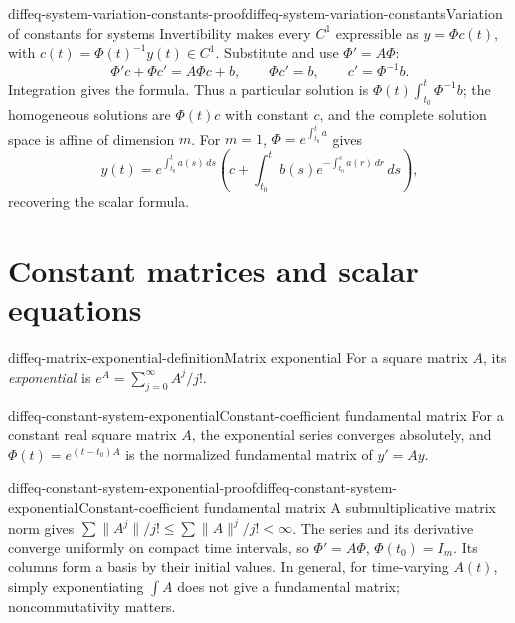 \documentclass[preview]{standalone}
\begin{document}
\begin{snippetproof}{diffeq-system-variation-constants-proof}{diffeq-system-variation-constants}{Variation of constants for systems}
    Invertibility makes every \(C^1\) \function expressible as
    \(y=\Phi c(t)\), with \(c(t)=\Phi(t)^{-1}y(t)\in C^1\).
    Substitute and use \(\Phi'=A\Phi\):
    \[
        \Phi'c+\Phi c'=A\Phi c+b,\qquad
        \Phi c'=b,\qquad c'=\Phi^{-1}b.
    \]
    Integration gives the formula. Thus a particular solution is
    \(\Phi(t)\int_{t_0}^t\Phi^{-1}b\); the homogeneous solutions are
    \(\Phi(t)c\) with constant \(c\), and the complete solution space is affine of dimension \(m\).
    For \(m=1\), \(\Phi=e^{\int_{t_0}^t a}\) gives
    \[
        y(t)=e^{\int_{t_0}^t a(s)\,ds}
        \left(c+\int_{t_0}^t b(s)e^{-\int_{t_0}^s a(r)\,dr}\,ds\right),
    \]
    recovering the scalar formula.
\end{snippetproof}

\section{Constant matrices and scalar equations}

\begin{snippetdefinition}{diffeq-matrix-exponential-definition}{Matrix exponential}
    For a square matrix \(A\), its \emph{exponential} is
    \(e^A=\sum_{j=0}^{\infty}A^j/j!\).
\end{snippetdefinition}

\begin{snippetproposition}{diffeq-constant-system-exponential}{Constant-coefficient fundamental matrix}
    For a constant real square matrix \(A\), the exponential series converges
    absolutely, and \(\Phi(t)=e^{(t-t_0)A}\) is the normalized fundamental
    matrix of \(y'=Ay\).
\end{snippetproposition}

\begin{snippetproof}{diffeq-constant-system-exponential-proof}{diffeq-constant-system-exponential}{Constant-coefficient fundamental matrix}
    A submultiplicative matrix norm gives
    \(\sum\|A^j\|/j!\leq\sum\|A\|^j/j!<\infty\).
    The series and its derivative converge uniformly on compact time intervals,
    so \(\Phi'=A\Phi\), \(\Phi(t_0)=I_m\).
    Its columns form a basis by their initial values.
    In general, for time-varying \(A(t)\), simply exponentiating \(\int A\)
    does not give a fundamental matrix; noncommutativity matters.
\end{snippetproof}
\end{document}
